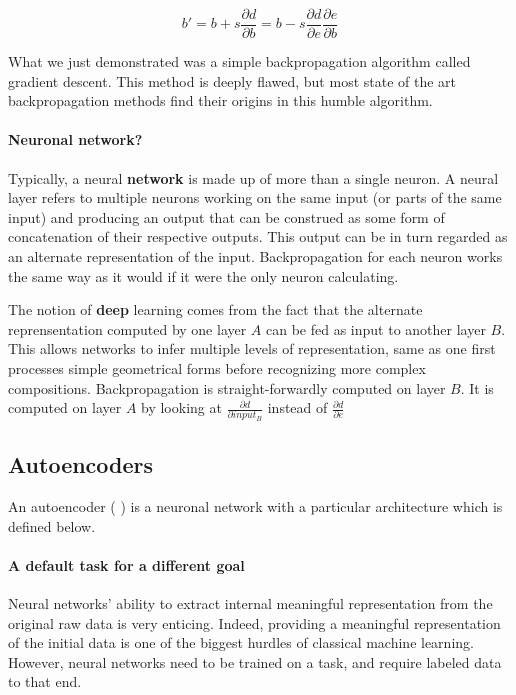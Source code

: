 \documentclass[conference]{IEEEtran}
\begin{document}
\begin{equation}
     b'=b + s\frac{\partial d}{\partial b}=b-s\frac{\partial d}{\partial e}\frac{\partial e}{\partial b}
\end{equation}

What we just demonstrated was a simple backpropagation algorithm called gradient
descent. This method is deeply flawed, but most state of the art backpropagation
methods find their origins in this humble algorithm.

\paragraph{Neuronal network?}

Typically, a neural \textbf{network} is made up of more than a single neuron. A
neural layer refers to multiple neurons working on the same input (or parts of
the same input) and producing an output that can be construed as some form of
concatenation of their respective outputs. This output can be in turn regarded
as an alternate representation of the input. Backpropagation for each neuron
works the same way as it would if it were the only neuron calculating.

The notion of \textbf{deep} learning comes from the fact that the alternate
reprensentation computed by one layer $A$ can be fed as input to another layer $B$.
This allows networks to infer multiple levels of representation, same as one
first processes simple geometrical forms before recognizing more complex
compositions. Backpropagation is straight-forwardly computed on layer $B$. It is
computed on layer $A$ by looking at $\frac{\partial d}{\partial input_B}$
instead of $\frac{\partial d}{\partial e}$
\subsection{Autoencoders}

An autoencoder (\cite{Hinton504}
) is a neuronal network with a particular architecture which is defined below.

\paragraph{A default task for a different goal}

Neural networks' ability to extract internal meaningful representation from the
original raw data is very enticing. Indeed, providing a meaningful
representation of the initial data is one of the biggest hurdles of classical
machine learning. However, neural networks need to be trained on a task, and
require labeled data to that end. 
\end{document}
